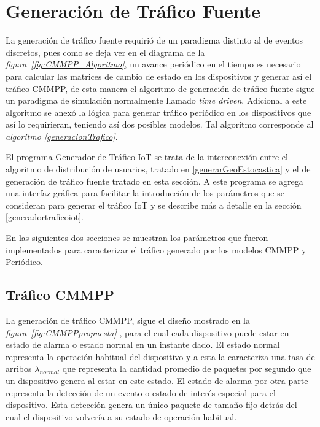 
\section{Generación de Tráfico Fuente}
La generación de tráfico fuente requirió de un paradigma distinto al de eventos discretos, pues como se deja ver en el diagrama de la \textit{figura~\ref{fig:CMMPP_Algoritmo}}, un avance periódico en el tiempo es necesario para calcular las matrices de cambio de estado en los dispositivos y generar así el tráfico CMMPP, de esta manera el algoritmo de generación de tráfico fuente sigue un paradigma de simulación normalmente llamado \textit{time driven}. Adicional a este algoritmo se anexó la lógica para generar tráfico periódico en los dispositivos que así lo requirieran, teniendo así dos posibles modelos. Tal algoritmo corresponde al \textit{algoritmo \ref{generacionTrafico}}. \newline

El programa Generador de Tráfico IoT se trata de la interconexión entre el algoritmo de distribución de usuarios, tratado en \ref{generarGeoEstocastica} y el de generación de tráfico fuente tratado en esta sección. A este programa se agrega una interfaz gráfica para facilitar la introducción de los parámetros que se consideran para generar el tráfico IoT y  se  describe más a detalle en la sección \ref{generadortraficoiot}. \newline

En las siguientes dos secciones se muestran los parámetros que fueron implementados para caracterizar el tráfico generado por los modelos CMMPP y Periódico. \newline
\subsection{Tráfico CMMPP}
La generación de tráfico CMMPP, sigue el diseño mostrado en la \textit{figura~\ref{fig:CMMPPpropuesta}} , para el cual cada dispositivo puede estar en estado de alarma o estado normal en un instante dado. El estado normal representa la operación habitual del dispositivo y a esta la caracteriza una tasa de arribos $ \lambda_{normal}$ que representa la cantidad promedio de paquetes por segundo que un dispositivo genera al estar en este estado. El estado de alarma por otra parte representa la detección de un evento o estado de interés especial para el dispositivo. Esta detección genera un único paquete de tamaño fijo detrás del cual el dispositivo volvería a su estado de operación habitual.\newline

